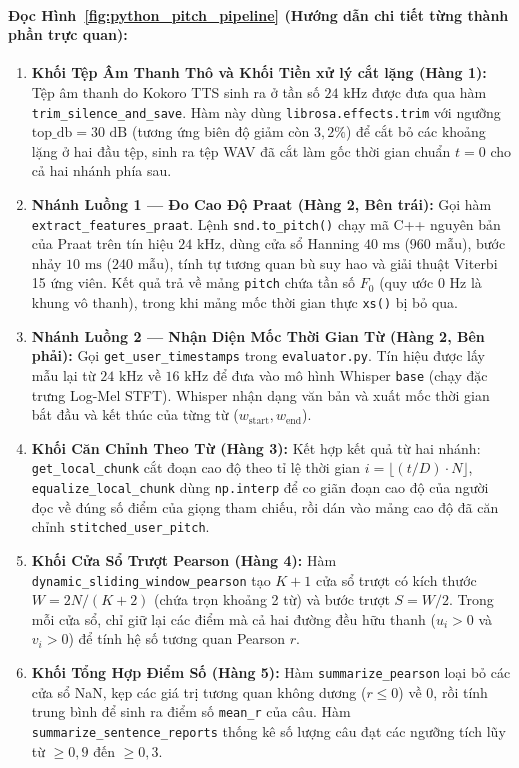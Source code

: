 \documentclass[11pt,a4paper]{article}
\begin{document}
\paragraph{Đọc Hình~\ref{fig:python_pitch_pipeline} (Hướng dẫn chi tiết từng thành phần trực quan):}
\begin{enumerate}
    \setlength{\itemsep}{1.5pt}
    \item \textbf{Khối Tệp Âm Thanh Thô và Khối Tiền xử lý cắt lặng (Hàng 1):} Tệp âm thanh do Kokoro TTS sinh ra ở tần số $24\text{ kHz}$ được đưa qua hàm \texttt{trim\_silence\_and\_save}. Hàm này dùng \texttt{librosa.effects.trim} với ngưỡng $\text{top\_db} = 30\text{ dB}$ (tương ứng biên độ giảm còn $3{,}2\%$) để cắt bỏ các khoảng lặng ở hai đầu tệp, sinh ra tệp WAV đã cắt làm gốc thời gian chuẩn $t = 0$ cho cả hai nhánh phía sau.
    \item \textbf{Nhánh Luồng 1 --- Đo Cao Độ Praat (Hàng 2, Bên trái):} Gọi hàm \texttt{extract\_features\_praat}. Lệnh \texttt{snd.to\_pitch()} chạy mã C++ nguyên bản của Praat trên tín hiệu $24\text{ kHz}$, dùng cửa sổ Hanning $40\text{ ms}$ ($960\text{ mẫu}$), bước nhảy $10\text{ ms}$ ($240\text{ mẫu}$), tính tự tương quan bù suy hao và giải thuật Viterbi 15 ứng viên. Kết quả trả về mảng \texttt{pitch} chứa tần số $F_0$ (quy ước $0\text{ Hz}$ là khung vô thanh), trong khi mảng mốc thời gian thực \texttt{xs()} bị bỏ qua.
    \item \textbf{Nhánh Luồng 2 --- Nhận Diện Mốc Thời Gian Từ (Hàng 2, Bên phải):} Gọi \texttt{get\_user\_timestamps} trong \texttt{evaluator.py}. Tín hiệu được lấy mẫu lại từ $24\text{ kHz}$ về $16\text{ kHz}$ để đưa vào mô hình Whisper \texttt{base} (chạy đặc trưng Log-Mel STFT). Whisper nhận dạng văn bản và xuất mốc thời gian bắt đầu và kết thúc của từng từ ($w_{\text{start}}, w_{\text{end}}$).
    \item \textbf{Khối Căn Chỉnh Theo Từ (Hàng 3):} Kết hợp kết quả từ hai nhánh: \texttt{get\_local\_chunk} cắt đoạn cao độ theo tỉ lệ thời gian $i = \lfloor (t/D) \cdot N \rfloor$, \texttt{equalize\_local\_chunk} dùng \texttt{np.interp} để co giãn đoạn cao độ của người đọc về đúng số điểm của giọng tham chiếu, rồi dán vào mảng cao độ đã căn chỉnh \texttt{stitched\_user\_pitch}.
    \item \textbf{Khối Cửa Sổ Trượt Pearson (Hàng 4):} Hàm \texttt{dynamic\_sliding\_window\_pearson} tạo $K+1$ cửa sổ trượt có kích thước $W = 2N/(K+2)$ (chứa trọn khoảng 2 từ) và bước trượt $S = W/2$. Trong mỗi cửa sổ, chỉ giữ lại các điểm mà cả hai đường đều hữu thanh ($u_i > 0$ và $v_i > 0$) để tính hệ số tương quan Pearson $r$.
    \item \textbf{Khối Tổng Hợp Điểm Số (Hàng 5):} Hàm \texttt{summarize\_pearson} loại bỏ các cửa sổ NaN, kẹp các giá trị tương quan không dương ($r \le 0$) về $0$, rồi tính trung bình để sinh ra điểm số \texttt{mean\_r} của câu. Hàm \texttt{summarize\_sentence\_reports} thống kê số lượng câu đạt các ngưỡng tích lũy từ $\ge 0{,}9$ đến $\ge 0{,}3$.
\end{enumerate}
\end{document}
